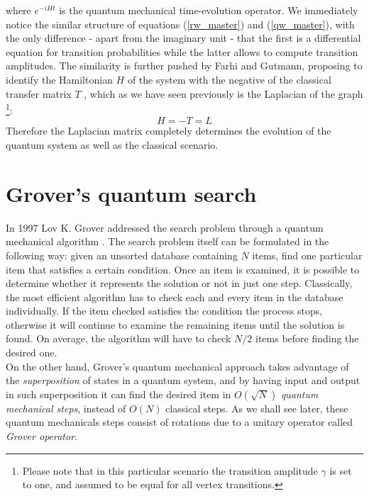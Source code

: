 where $e^{-iHt}$ is the quantum mechanical time-evolution operator. We immediately notice the similar structure of equations (\ref{rw_master}) and (\ref{qw_master}), with the only difference - apart from the imaginary unit - that the first is a differential equation for transition probabilities while the latter allows to compute transition amplitudes. The similarity is further pushed by Farhi and Gutmann, proposing to identify the Hamiltonian $H$ of the system with the negative of the classical transfer matrix $T$ \cite{Childs2001}, which as we have seen previously is the Laplacian of the graph \footnote{Please note that in this particular scenario the transition amplitude $\gamma$ is set to one, and assumed to be equal for all vertex transitions.}:
\begin{equation}
  H = -T = L
  \label{qw_Hamiltonian}
\end{equation}
Therefore the Laplacian matrix completely determines the evolution of the quantum system as well as the classical scenario.



\section{Grover's quantum search}\label{sec:grover search}
In 1997 Lov K. Grover addressed the search problem through a quantum mechanical algorithm \cite{Grover1997}. The search problem itself can be formulated in the following way: given an unsorted database containing $N$ items, find one particular item that satisfies a certain condition. Once an item is examined, it is possible to determine whether it represents the solution or not in just one step.
Classically, the most efficient algorithm has to check each and every item in the database individually. If the item checked satisfies the condition the process stops, otherwise it will continue to examine the remaining items until the solution is found. On average, the algorithm will have to check $N/2$ items before finding the desired one.\\On the other hand, Grover's quantum mechanical approach takes advantage of the \textit{superposition} of states in a quantum system, and by having input and output in such superposition it can find the desired item in $O(\sqrt{N})$ \textit{quantum mechanical steps}, instead of $O(N)$ classical steps. As we shall see later, these quantum mechanicals steps consist of rotations due to a unitary operator called \textit{Grover operator}. \\

